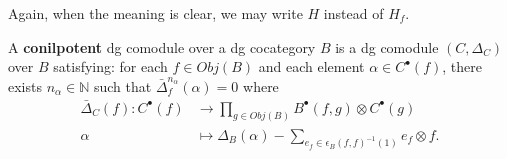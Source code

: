 Again, when the meaning is clear, 
we may write $H$ instead of $H_f$.
%
\begin{defn} A \textbf{conilpotent} dg 
comodule over a dg cocategory $B$ 
is a dg comodule $(C, \Delta_C)$ 
over $B$ satisfying: for each 
$f \in Obj(B)$ and each element 
$\alpha \in C^\bullet(f)$, there exists 
$n_\alpha \in \mathbb{N}$ such that 
$\bar{\Delta}_f^{n_\alpha}(\alpha) = 0$
where
\begin{align*}
\bar{\Delta}_C(f): C^\bullet(f) 
&\to 
  \prod \limits_{g \in Obj(B)} 
  B^\bullet(f,g) \otimes
  C^\bullet(g)\\
\alpha
&\mapsto
\Delta_B(\alpha) 
  - \sum \limits_{e_f \in 
  \epsilon_B(f,f)^{-1}(1)}
  e_f \otimes f.
\end{align*}
\end{defn}
%

